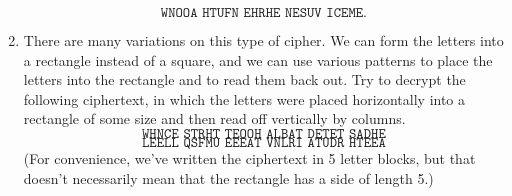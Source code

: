 \begin{exercise}
\begin{enumerate}
              \[\texttt{WNOOA HTUFN EHRHE NESUV ICEME.}\]
        \item There are many variations on this type of cipher. We can form the letters into a rectangle instead of a square, and we can use various patterns to place the letters into the rectangle and to read them back out. Try to decrypt the following  ciphertext, in which the letters were placed horizontally into a rectangle of some size and then read off vertically by columns.
              \[\texttt{WHNCE STRHT TEOOH ALBAT DETET SADHE}\]
              \vspace*{-1cm}
              \[\texttt{LEELL QSFMU EEEAT VNLRI ATUDR HTEEA}\]
              (For convenience, we’ve written the ciphertext in 5 letter blocks, but that doesn’t necessarily mean that the rectangle has a side of length 5.)
    \end{enumerate}
\end{exercise}

